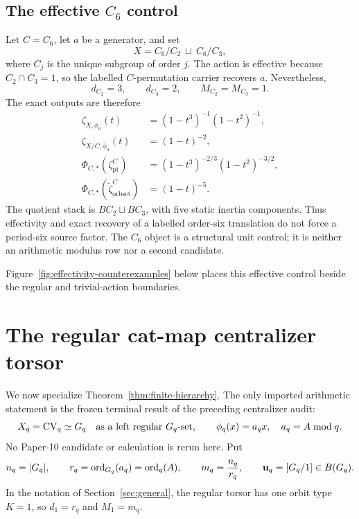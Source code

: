 \documentclass[11pt]{article}
\theoremstyle{definition}
\theoremstyle{remark}
\begin{document}
\subsection{The effective \texorpdfstring{\(C_6\)}{C6} control}

Let \(C=C_6\), let \(a\) be a generator, and set
\begin{equation}
  X=C_6/C_2\ \sqcup\ C_6/C_3,
  \label{eq:c6-control}
\end{equation}
where \(C_j\) is the unique subgroup of order \(j\).  The action is effective
because \(C_2\cap C_3=1\), so the labelled \(C\)-permutation carrier recovers
\(a\).  Nevertheless,
\[
  d_{C_2}=3,\qquad d_{C_3}=2,\qquad
  M_{C_2}=M_{C_3}=1.
\]
The exact outputs are therefore
\begin{align}
  \zeta_{X,\phi_a}(t)
    &=(1-t^3)^{-1}(1-t^2)^{-1},
    \label{eq:c6-source}\\
  \zeta_{X/C,\bar\phi_a}(t)
    &=(1-t)^{-2},
    \label{eq:c6-coarse}\\
  \Phi_{C,*}(\zeta_{\mathrm{pt}}^C)
    &=(1-t^3)^{-2/3}(1-t^2)^{-3/2},
    \label{eq:c6-point-orbifold}\\
  \Phi_{C,*}(\widetilde\zeta_{\mathrm{orbset}}^C)
    &=(1-t)^{-5}.
    \label{eq:c6-orbit-orbifold}
\end{align}
The quotient stack is \(BC_2\sqcup BC_3\), with five static inertia
components.  Thus effectivity and exact recovery of a labelled order-six
translation do not force a period-six source factor.  The \(C_6\) object is
a structural unit control; it is neither an arithmetic modulus row nor a
second candidate.

Figure~\ref{fig:effectivity-counterexamples} below places this effective
control beside the regular and trivial-action boundaries.

\section{The regular cat-map centralizer torsor}
\label{sec:cat-specialization}

We now specialize Theorem~\ref{thm:finite-hierarchy}.  The only imported
arithmetic statement is the frozen terminal result of the preceding
centralizer audit:
\begin{equation}
  X_q=\mathrm{CV}_q\simeq G_q
  \quad\text{as a left regular \(G_q\)-set},
  \qquad
  \phi_q(x)=a_qx,
  \quad a_q=A\bmod q.
  \label{eq:regular-torsor}
\end{equation}
No Paper-10 candidate or calculation is rerun here.  Put
\begin{equation}
  n_q=|G_q|,
  \qquad
  r_q=\operatorname{ord}_{G_q}(a_q)=\operatorname{ord}_q(A),
  \qquad
  m_q=\frac{n_q}{r_q},
  \qquad
  \mathbf u_q=[G_q/1]\in B(G_q).
  \label{eq:n-r-m}
\end{equation}
In the notation of Section~\ref{sec:general}, the regular torsor has one
orbit type \(K=1\), so \(d_1=r_q\) and \(M_1=m_q\).
\end{document}
